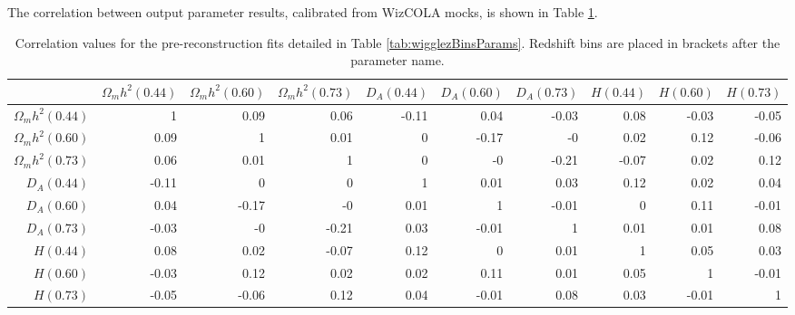 \documentclass[a4paper,fleqn,usenatbib]{mnras}
\begin{document}
The correlation between output parameter results, calibrated from WizCOLA mocks, is shown in Table \ref{tab:cor}.
\begin{table}
	\centering
	\caption{Correlation values for the pre-reconstruction fits detailed in Table \ref{tab:wigglezBinsParams}. Redshift bins are placed in brackets after the parameter name.}
	\label{tab:cor}
	\begin{tabular}{rrrrrrrrrr}
		\hline
		~ & $\Omega_m h^2(0.44)$ &  $\Omega_m h^2(0.60)$ &   $\Omega_m h^2(0.73)$ &   $D_A(0.44)$ &   $D_A(0.60)$ &   $D_A(0.73)$ &    $H(0.44)$ &   $H(0.60)$ &   $H(0.73)$ \\
		\hline
	    $\Omega_m h^2(0.44)$ &    1    &        0.09 &        0.06 &       -0.11 &        0.04 &       -0.03 &        0.08 &       -0.03 &       -0.05 \\
	    $\Omega_m h^2(0.60)$ &    0.09 &        1    &        0.01 &        0    &       -0.17 &       -0    &        0.02 &        0.12 &       -0.06 \\
	    $\Omega_m h^2(0.73)$ &    0.06 &        0.01 &        1    &        0    &       -0    &       -0.21 &       -0.07 &        0.02 &        0.12 \\
	    $D_A(0.44)$ &    -0.11 &        0    &        0    &        1    &        0.01 &        0.03 &        0.12 &        0.02 &        0.04 \\
	    $D_A(0.60)$ &     0.04 &       -0.17 &       -0    &        0.01 &        1    &       -0.01 &        0    &        0.11 &       -0.01 \\
	    $D_A(0.73)$ &    -0.03 &       -0    &       -0.21 &        0.03 &       -0.01 &        1    &        0.01 &        0.01 &        0.08 \\
        $H(0.44)$ &    0.08 &        0.02 &       -0.07 &        0.12 &        0    &        0.01 &        1    &        0.05 &        0.03 \\
	    $H(0.60)$ &     -0.03 &        0.12 &        0.02 &        0.02 &        0.11 &        0.01 &        0.05 &        1    &       -0.01 \\
	    $H(0.73)$ &    -0.05 &       -0.06 &        0.12 &        0.04 &       -0.01 &        0.08 &        0.03 &       -0.01 &        1    \\
		\hline
	\end{tabular}
\end{table}

\bsp	%
\label{lastpage}
\end{document}
